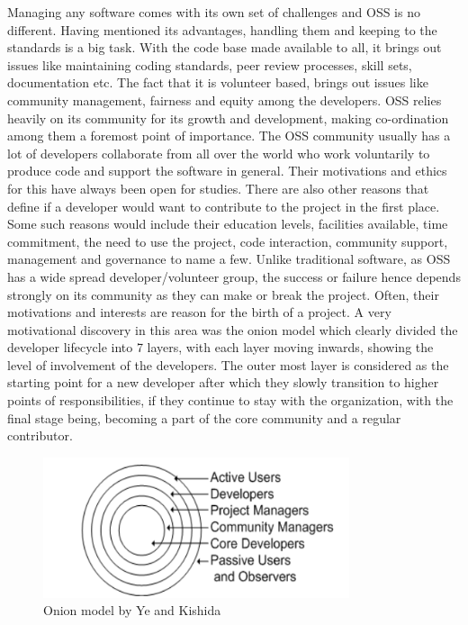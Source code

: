 \documentclass[seploa]{beavtex}
\begin{document}
Managing any software comes with its own set of challenges and OSS is no different. Having mentioned its advantages, handling them and keeping to the standards is a big task. With the code base made available to all, it brings out issues like maintaining coding standards, peer review processes, skill sets, documentation etc\cite{tum2005}. The fact that it is volunteer based, brings out issues like community management, fairness and equity among the developers. OSS relies heavily on its community for its growth and development\cite{seth2010}, making co-ordination among them a foremost point of importance. The OSS community usually has a lot of developers collaborate from all over the world who work voluntarily to produce code and support the software in general. Their motivations and ethics for this have always been open for studies\cite{greg2002}. There are also other reasons that define if a developer would want to contribute to the project in the first place. Some such reasons would include their education levels, facilities available, time commitment, the need to use the project, code interaction, community support, management and governance to name a few\cite{chawn2012}. Unlike traditional software, as OSS has a wide spread developer/volunteer group, the success or failure hence depends strongly on its community as they can make or break the project. Often, their motivations and interests are reason for the birth of a project. A very motivational discovery in this area was the onion model which clearly divided the developer lifecycle into 7 layers, with each layer moving inwards, showing the level of involvement of the developers. The outer most layer is considered as the starting point for a new developer after which they slowly transition to higher points of responsibilities, if they continue to stay with the organization, with the final stage being, becoming a part of the core community and a regular contributor\cite{kishida2003}.

\begin{figure}[H]
\centering
\includegraphics[width=90mm]{onion.png}
\caption{Onion model by Ye and Kishida}
\end{figure}
\end{document}
